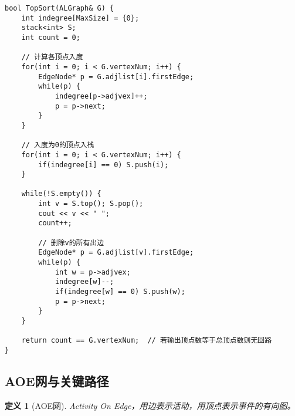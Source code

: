 \documentclass[12pt,a4paper]{amsart}
\newtheorem{definition}{定义}[section]
\begin{document}
\begin{center}
\end{center}

\begin{lstlisting}[caption=拓扑排序算法实现]
bool TopSort(ALGraph& G) {
    int indegree[MaxSize] = {0};
    stack<int> S;
    int count = 0;
    
    // 计算各顶点入度
    for(int i = 0; i < G.vertexNum; i++) {
        EdgeNode* p = G.adjlist[i].firstEdge;
        while(p) {
            indegree[p->adjvex]++;
            p = p->next;
        }
    }
    
    // 入度为0的顶点入栈
    for(int i = 0; i < G.vertexNum; i++) {
        if(indegree[i] == 0) S.push(i);
    }
    
    while(!S.empty()) {
        int v = S.top(); S.pop();
        cout << v << " ";
        count++;
        
        // 删除v的所有出边
        EdgeNode* p = G.adjlist[v].firstEdge;
        while(p) {
            int w = p->adjvex;
            indegree[w]--;
            if(indegree[w] == 0) S.push(w);
            p = p->next;
        }
    }
    
    return count == G.vertexNum;  // 若输出顶点数等于总顶点数则无回路
}
\end{lstlisting}

\subsection{AOE网与关键路径}

\begin{definition}[AOE网]
Activity On Edge，用边表示活动，用顶点表示事件的有向图。
\end{definition}
\end{document}
